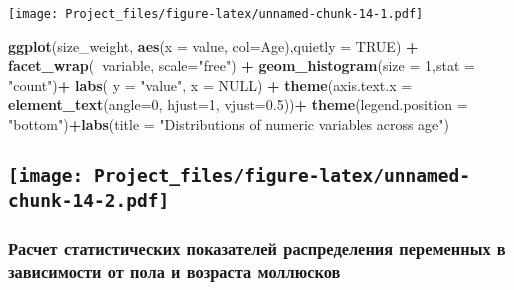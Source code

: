 \documentclass[]{article}
\newenvironment{Shaded}{\begin{snugshade}}{\end{snugshade}}
\newcommand{\DataTypeTok}[1]{\textcolor[rgb]{0.13,0.29,0.53}{#1}}
\newcommand{\DecValTok}[1]{\textcolor[rgb]{0.00,0.00,0.81}{#1}}
\newcommand{\FloatTok}[1]{\textcolor[rgb]{0.00,0.00,0.81}{#1}}
\newcommand{\KeywordTok}[1]{\textcolor[rgb]{0.13,0.29,0.53}{\textbf{#1}}}
\newcommand{\NormalTok}[1]{#1}
\newcommand{\OperatorTok}[1]{\textcolor[rgb]{0.81,0.36,0.00}{\textbf{#1}}}
\newcommand{\OtherTok}[1]{\textcolor[rgb]{0.56,0.35,0.01}{#1}}
\newcommand{\StringTok}[1]{\textcolor[rgb]{0.31,0.60,0.02}{#1}}
\begin{document}
\texttt{[image: Project\_files/figure-latex/unnamed-chunk-14-1.pdf]}

\begin{Shaded}
\begin{Highlighting}[]
\KeywordTok{ggplot}\NormalTok{(size_weight, }\KeywordTok{aes}\NormalTok{(}\DataTypeTok{x =}\NormalTok{ value, }\DataTypeTok{col=}\NormalTok{Age),}\DataTypeTok{quietly =} \OtherTok{TRUE}\NormalTok{) }\OperatorTok{+}\StringTok{ }\KeywordTok{facet_wrap}\NormalTok{(}\OperatorTok{~}\NormalTok{variable, }\DataTypeTok{scale=}\StringTok{"free"}\NormalTok{) }\OperatorTok{+}\StringTok{ }\KeywordTok{geom_histogram}\NormalTok{(}\DataTypeTok{size =} \DecValTok{1}\NormalTok{,}\DataTypeTok{stat =} \StringTok{"count"}\NormalTok{)}\OperatorTok{+}\StringTok{ }\KeywordTok{labs}\NormalTok{( }\DataTypeTok{y =} \StringTok{"value"}\NormalTok{, }\DataTypeTok{x =} \OtherTok{NULL}\NormalTok{) }\OperatorTok{+}\StringTok{ }\KeywordTok{theme}\NormalTok{(}\DataTypeTok{axis.text.x =} \KeywordTok{element_text}\NormalTok{(}\DataTypeTok{angle=}\DecValTok{0}\NormalTok{, }\DataTypeTok{hjust=}\DecValTok{1}\NormalTok{, }\DataTypeTok{vjust=}\FloatTok{0.5}\NormalTok{))}\OperatorTok{+}\StringTok{ }\KeywordTok{theme}\NormalTok{(}\DataTypeTok{legend.position =} \StringTok{"bottom"}\NormalTok{)}\OperatorTok{+}\KeywordTok{labs}\NormalTok{(}\DataTypeTok{title =} \StringTok{"Distributions of numeric variables across age"}\NormalTok{)}
\end{Highlighting}
\end{Shaded}

\hypertarget{section}{%
\subsection[]{\texorpdfstring{\protect\texttt{[image: Project\_files/figure-latex/unnamed-chunk-14-2.pdf]}}{}}\label{section}}

\hypertarget{ux440ux430ux441ux447ux435ux442-ux441ux442ux430ux442ux438ux441ux442ux438ux447ux435ux441ux43aux438ux445-ux43fux43eux43aux430ux437ux430ux442ux435ux43bux435ux439-ux440ux430ux441ux43fux440ux435ux434ux435ux43bux435ux43dux438ux44f-ux43fux435ux440ux435ux43cux435ux43dux43dux44bux445-ux432-ux437ux430ux432ux438ux441ux438ux43cux43eux441ux442ux438-ux43eux442-ux43fux43eux43bux430-ux438-ux432ux43eux437ux440ux430ux441ux442ux430-ux43cux43eux43bux43bux44eux441ux43aux43eux432}{%
\subsubsection{Расчет статистических показателей распределения
переменных в зависимости от пола и возраста
моллюсков}\label{ux440ux430ux441ux447ux435ux442-ux441ux442ux430ux442ux438ux441ux442ux438ux447ux435ux441ux43aux438ux445-ux43fux43eux43aux430ux437ux430ux442ux435ux43bux435ux439-ux440ux430ux441ux43fux440ux435ux434ux435ux43bux435ux43dux438ux44f-ux43fux435ux440ux435ux43cux435ux43dux43dux44bux445-ux432-ux437ux430ux432ux438ux441ux438ux43cux43eux441ux442ux438-ux43eux442-ux43fux43eux43bux430-ux438-ux432ux43eux437ux440ux430ux441ux442ux430-ux43cux43eux43bux43bux44eux441ux43aux43eux432}}
\end{document}
